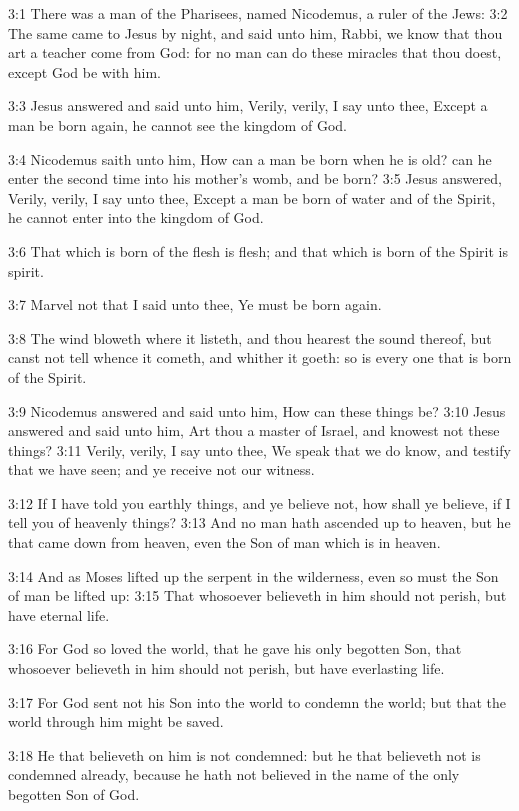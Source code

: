 3:1 There was a man of the Pharisees, named Nicodemus, a ruler of the Jews: 3:2 The same came to Jesus by night, and said unto him, Rabbi, we know that thou art a teacher come from God: for no man can do these miracles that thou doest, except God be with him.

3:3 Jesus answered and said unto him, Verily, verily, I say unto thee, Except a man be born again, he cannot see the kingdom of God.

3:4 Nicodemus saith unto him, How can a man be born when he is old?  can he enter the second time into his mother's womb, and be born?  3:5 Jesus answered, Verily, verily, I say unto thee, Except a man be born of water and of the Spirit, he cannot enter into the kingdom of God.

3:6 That which is born of the flesh is flesh; and that which is born of the Spirit is spirit.

3:7 Marvel not that I said unto thee, Ye must be born again.

3:8 The wind bloweth where it listeth, and thou hearest the sound thereof, but canst not tell whence it cometh, and whither it goeth: so is every one that is born of the Spirit.

3:9 Nicodemus answered and said unto him, How can these things be?  3:10 Jesus answered and said unto him, Art thou a master of Israel, and knowest not these things?  3:11 Verily, verily, I say unto thee, We speak that we do know, and testify that we have seen; and ye receive not our witness.

3:12 If I have told you earthly things, and ye believe not, how shall ye believe, if I tell you of heavenly things?  3:13 And no man hath ascended up to heaven, but he that came down from heaven, even the Son of man which is in heaven.

3:14 And as Moses lifted up the serpent in the wilderness, even so must the Son of man be lifted up: 3:15 That whosoever believeth in him should not perish, but have eternal life.

3:16 For God so loved the world, that he gave his only begotten Son, that whosoever believeth in him should not perish, but have everlasting life.

3:17 For God sent not his Son into the world to condemn the world; but that the world through him might be saved.

3:18 He that believeth on him is not condemned: but he that believeth not is condemned already, because he hath not believed in the name of the only begotten Son of God.

